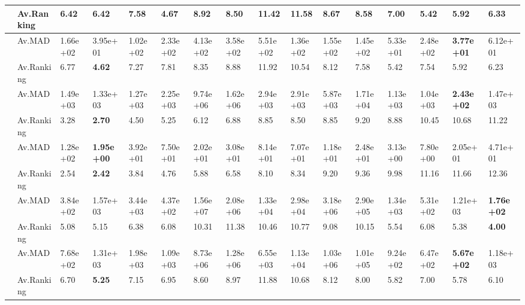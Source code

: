 \begin{ThreePartTable}
{\begin{longtable}{m{0.1cm} C{1.25cm} m{0.88cm} m{0.88cm} m{0.88cm} m{0.88cm} m{0.88cm} m{0.88cm} m{0.88cm} m{0.88cm} m{0.88cm} m{0.88cm} m{0.88cm} m{0.88cm} m{0.88cm} m{0.88cm}}
& Av.Ranking  & 6.42 & 6.42 & 7.58 & \textbf{4.67} & 8.92 & 8.50 & 11.42 & 11.58 & 8.67 & 8.58 & 7.00 & 5.42 & 5.92 & 6.33 \\
\midrule
 & Av.MAD  & 1.66e+02 & 3.95e+01 & 1.02e+02 & 2.33e+02 & 4.13e+02 & 3.58e+02 & 5.51e+02 & 1.36e+02 & 1.55e+02 & 1.45e+02 & 5.33e+01 & 2.48e+02 & \textbf{3.77e+01} & 6.12e+01 \\
& Av.Ranking  & 6.77 & \textbf{4.62} & 7.27 & 7.81 & 8.35 & 8.88 & 11.92 & 10.54 & 8.12 & 7.58 & 5.42 & 7.54 & 5.92 & 6.23 \\
\midrule
 & Av.MAD  & 1.49e+03 & 1.33e+03 & 1.27e+03 & 2.25e+03 & 9.74e+06 & 1.62e+06 & 2.94e+03 & 2.91e+03 & 5.87e+03 & 1.71e+04 & 1.13e+03 & 1.04e+03 & \textbf{2.43e+02} & 1.47e+03 \\
& Av.Ranking  & 3.28 & \textbf{2.70} & 4.50 & 5.25 & 6.12 & 6.88 & 8.85 & 8.50 & 8.85 & 9.20 & 8.88 & 10.45 & 10.68 & 11.22 \\
\midrule
 & Av.MAD  & 1.28e+02 & \textbf{1.95e+00} & 3.92e+01 & 7.50e+01 & 2.02e+01 & 3.08e+01 & 8.14e+01 & 7.07e+01 & 1.18e+01 & 2.48e+01 & 3.13e+00 & 7.80e+00 & 2.05e+01 & 4.71e+01 \\
& Av.Ranking  & 2.54 & \textbf{2.42} & 3.84 & 4.76 & 5.88 & 6.58 & 8.10 & 8.34 & 9.20 & 9.36 & 9.98 & 11.16 & 11.66 & 12.36 \\\midrule
 & Av.MAD  & 3.84e+02 & 1.57e+03 & 3.44e+03 & 4.37e+02 & 1.56e+07 & 2.08e+06 & 1.33e+04 & 2.98e+04 & 3.18e+06 & 2.90e+05 & 1.34e+03 & 5.31e+02 & 1.21e+03 & \textbf{1.76e+02} \\
& Av.Ranking  & 5.08 & 5.15 & 6.38 & 6.08 & 10.31 & 11.38 & 10.46 & 10.77 & 9.08 & 10.15 & 5.54 & 6.08 & 5.38 & \textbf{4.00} \\
\midrule
 & Av.MAD  & 7.68e+02 & 1.31e+03 & 1.98e+03 & 1.09e+03 & 8.73e+06 & 1.28e+06 & 6.55e+03 & 1.13e+04 & 1.03e+06 & 1.01e+05 & 9.24e+02 & 6.47e+02 & \textbf{5.67e+02} & 1.18e+03 \\
& Av.Ranking  & 6.70 & \textbf{5.25} & 7.15 & 6.95 & 8.60 & 8.97 & 11.88 & 10.68 & 8.12 & 8.00 & 5.82 & 7.00 & 5.78 & 6.10 \\

\end{longtable}}
\end{ThreePartTable}
